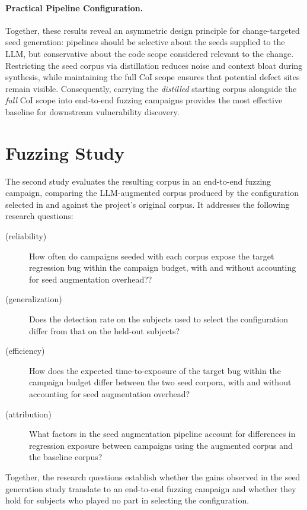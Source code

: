 \paragraph{Practical Pipeline Configuration.}
Together, these results reveal an asymmetric design principle for change-targeted seed generation: pipelines should be selective about the seeds supplied to the LLM, but conservative about the code scope considered relevant to the change.
Restricting the seed corpus via distillation reduces noise and context bloat during synthesis, while maintaining the full \ac{CoI} scope ensures that potential defect sites remain visible.
Consequently, carrying the \emph{distilled} starting corpus alongside the \emph{full} \ac{CoI} scope into end-to-end fuzzing campaigns provides the most effective baseline for downstream vulnerability discovery.

\section{Fuzzing Study}\label{sec:eval:fuzzing}
The second study evaluates the resulting corpus in an end-to-end fuzzing campaign, comparing the LLM-augmented corpus produced by the configuration selected in  and  against the project's original corpus.
It addresses the following research questions:

\begin{description}
  \item[ (reliability)] How often do campaigns seeded with each corpus expose the target regression bug within the campaign budget, with and without accounting for seed augmentation overhead??
  \item[ (generalization)] Does the detection rate on the subjects used to select the configuration differ from that on the held-out subjects?
  \item[ (efficiency)] How does the expected time-to-exposure of the target bug within the campaign budget differ between the two seed corpora, with and without accounting for seed augmentation overhead?
  \item[ (attribution)] What factors in the seed augmentation pipeline account for differences in regression exposure between campaigns using the augmented corpus and the baseline corpus?
\end{description}

Together, the research questions establish whether the gains observed in the seed generation study translate to an end-to-end fuzzing campaign and whether they hold for subjects who played no part in selecting the configuration.

